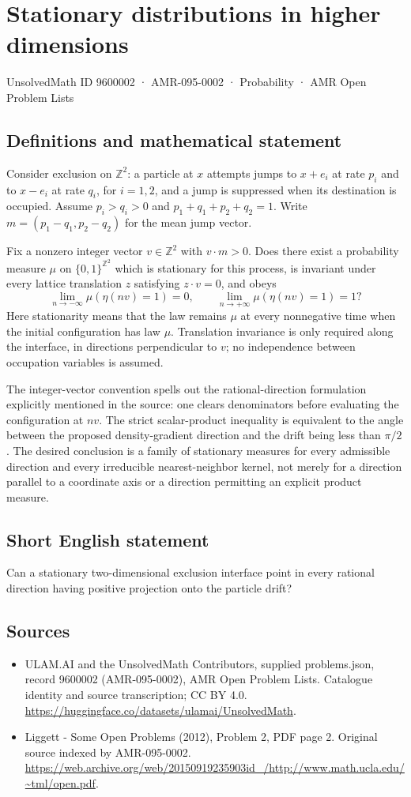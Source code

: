 \documentclass[11pt,a4paper]{article}
\begin{document}
\section*{Stationary distributions in higher dimensions}\label{9600002}
{\small UnsolvedMath ID 9600002 · AMR-095-0002 · Probability · AMR Open Problem Lists}
\subsection{Definitions and mathematical statement}
Consider exclusion on $\mathbb Z^2$: a particle at $x$ attempts jumps to $x+e_i$ at rate $p_i$ and to $x-e_i$ at rate $q_i$, for $i=1,2$, and a jump is suppressed when its destination is occupied. Assume $p_i>q_i>0$ and $p_1+q_1+p_2+q_2=1$. Write $m=(p_1-q_1,p_2-q_2)$ for the mean jump vector.

Fix a nonzero integer vector $v\in\mathbb Z^2$ with $v\cdot m>0$. Does there exist a probability measure $\mu$ on $\{0,1\}^{\mathbb Z^2}$ which is stationary for this process, is invariant under every lattice translation $z$ satisfying $z\cdot v=0$, and obeys
\[
\lim_{n\to-\infty}\mu(\eta(nv)=1)=0,
\qquad
\lim_{n\to+\infty}\mu(\eta(nv)=1)=1?
\]
Here stationarity means that the law remains $\mu$ at every nonnegative time when the initial configuration has law $\mu$. Translation invariance is only required along the interface, in directions perpendicular to $v$; no independence between occupation variables is assumed.

The integer-vector convention spells out the rational-direction formulation explicitly mentioned in the source: one clears denominators before evaluating the configuration at $nv$. The strict scalar-product inequality is equivalent to the angle between the proposed density-gradient direction and the drift being less than $\pi/2$. The desired conclusion is a family of stationary measures for every admissible direction and every irreducible nearest-neighbor kernel, not merely for a direction parallel to a coordinate axis or a direction permitting an explicit product measure.
\subsection{Short English statement}
Can a stationary two-dimensional exclusion interface point in every rational direction having positive projection onto the particle drift?
\subsection{Sources}
\begin{itemize}
\item[S1] ULAM.AI and the UnsolvedMath Contributors, supplied problems.json, record 9600002 (AMR-095-0002), AMR Open Problem Lists. Catalogue identity and source transcription; CC BY 4.0.
\url{https://huggingface.co/datasets/ulamai/UnsolvedMath}.
\item[S2] Liggett - Some Open Problems (2012), Problem 2, PDF page 2. Original source indexed by AMR-095-0002.
\url{https://web.archive.org/web/20150919235903id_/http://www.math.ucla.edu/~tml/open.pdf}.
\end{itemize}
\end{document}
